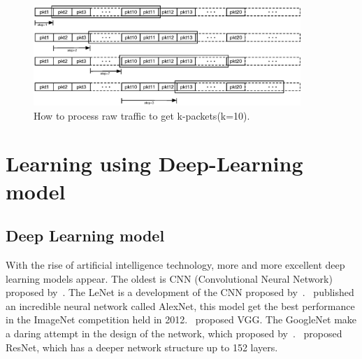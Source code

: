 \documentclass[conference]{IEEEtran}
\begin{document}
\begin{figure}[htp]
\begin{center}
\includegraphics[width=0.9\textwidth]{dataset.eps}
\caption{How to process raw traffic to get k-packets(k=10).}\label{fig:dataset}
\end{center}
\end{figure}

\section{Learning using Deep-Learning model}
\label{sec:learningusingdeeplearningmodel}
\subsection{Deep Learning model}
With the rise of artificial intelligence technology, more and more excellent deep learning models appear. The oldest is CNN (Convolutional Neural Network) proposed by~\cite{6}. The LeNet is a development of the CNN proposed by~\cite{7}.~\cite{8} published an incredible neural network called AlexNet, this model get the best performance in the ImageNet competition held in 2012.~\cite{9} proposed VGG. The GoogleNet make a daring attempt in the design of the network, which proposed by~\cite{10}.~\cite{11} proposed ResNet, which has a deeper network structure up to 152 layers.
\end{document}
